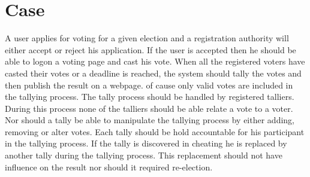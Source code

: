 \section{Case}
A user applies for voting for a given election and a registration authority will either accept or reject his application.  If the user is accepted then he should be able to logon a voting page and cast his vote.  When all the registered voters have casted their votes or a deadline is reached, the system should tally the votes and then publish the result on a webpage. of cause only valid votes are included in the tallying process. The tally process should be handled by registered talliers. During this process none of the talliers should be able relate a  vote to a voter. Nor should a tally be able to manipulate the tallying process by either adding, removing or alter votes. Each tally should be hold accountable for his participant in the tallying process. If the tally is discovered in cheating he is replaced by another tally during the tallying process. This replacement should not have influence on the result nor should it required re-election. 
